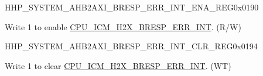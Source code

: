 \begin{register}{H}{HP\_SYSTEM\_AHB2AXI\_BRESP\_ERR\_INT\_ENA\_REG}{0x0190}\label{regdesc:HPSYSTEMAHB2AXIBRESPERRINTENAREG}
%
%
\regnewline%
\begin{regdesc}\begin{reglist}
\label{fielddesc:HPSYSTEMCPUICMH2XBRESPERRINTENA}\item [HP\_SYSTEM\_CPU\_ICM\_H2X\_BRESP\_ERR\_INT\_ENA] Write 1 to enable \hyperref[tab:sysreg-int-sources]{CPU\_ICM\_H2X\_BRESP\_ERR\_INT}. (R/W)
\end{reglist}\end{regdesc}
\end{register}


\begin{register}{H}{HP\_SYSTEM\_AHB2AXI\_BRESP\_ERR\_INT\_CLR\_REG}{0x0194}\label{regdesc:HPSYSTEMAHB2AXIBRESPERRINTCLRREG}
%
%
\regnewline%
\begin{regdesc}\begin{reglist}
\label{fielddesc:HPSYSTEMCPUICMH2XBRESPERRINTCLR}\item [HP\_SYSTEM\_CPU\_ICM\_H2X\_BRESP\_ERR\_INT\_CLR] Write 1 to clear \hyperref[tab:sysreg-int-sources]{CPU\_ICM\_H2X\_BRESP\_ERR\_INT}. (WT)
\end{reglist}\end{regdesc}
\end{register}


